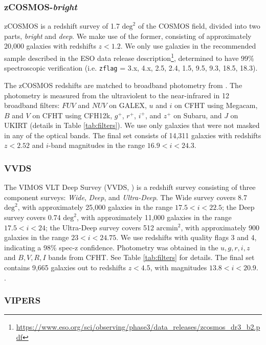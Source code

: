 \subsubsection{zCOSMOS-\textit{bright}}

zCOSMOS \citep{Lilly2009a} is a redshift survey of 1.7 $\text{deg}^2$ of the COSMOS field, divided into two parts, \textit{bright} and \textit{deep}. 
We make use of the former, consisting of approximately 20,000 galaxies with redshifts $z < 1.2$.
We only use galaxies in the recommended sample described in the ESO data release description\footnote{\url{https://www.eso.org/sci/observing/phase3/data_releases/zcosmos_dr3_b2.pdf}}, determined to have $99\%$ spectroscopic verification (i.e. \texttt{zflag} = 3.x, 4.x, 2.5, 2.4, 1.5, 9.5, 9.3, 18.5, 18.3).

The zCOSMOS redshifts are matched to broadband photometry from \citet{Ilbert2009}.
The photometry is measured from the ultraviolent to the near-infrared in 12 broadband filters: $FUV$ and $NUV$ on GALEX, $u$ and $i$ on CFHT using Megacam, $B$ and $V$ on CFHT using CFH12k, $g^+$, $r^+$, $i^+$, and $z^+$ on Subaru, and $J$ on UKIRT (details in Table \ref{tab:filters}).
We use only galaxies that were not masked in any of the optical bands.
The final set consists of 14,311 galaxies with redshifts $z < 2.52$ and $i$-band magnitudes in the range $16.9 < i < 24.3$.

\subsubsection{VVDS}

The VIMOS VLT Deep Survey (VVDS, \citealt{LeFevre2013b}) is a redshift survey consisting of three component surveys: \textit{Wide}, \textit{Deep}, and \textit{Ultra-Deep}. 
The Wide survey covers 8.7 $\text{deg}^2$, with approximately 25,000 galaxies in the range $17.5 < i < 22.5$; the Deep survey covers 0.74 $\text{deg}^2$, with approximately 11,000 galaxies in the range $17.5 < i < 24$; the Ultra-Deep survey covers 512 $\text{arcmin}^2$, with approximately 900 galaxies in the range $23 < i < 24.75$.
We use redshifts with quality flags 3 and 4, indicating a 98\% spec-z confidence.
Photometry was obtained in the $u,g,r,i,z$ and $B,V,R,I$ bands from CFHT. See Table \ref{tab:filters} for details.
The final set contains 9,665 galaxies out to redshifts $z < 4.5$, with magnitudes $ 13.8 < i < 20.9$.
.

\subsubsection{VIPERS}

